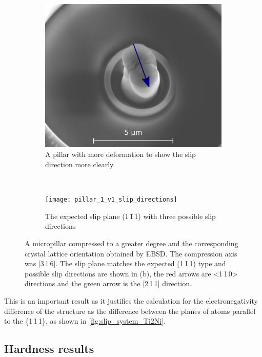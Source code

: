 \begin{figure}
\centering
\begin{subfigure}{0.4\textwidth}
    \centering
    \includegraphics[width=\textwidth]{pillar_1_v1}
    \caption{A pillar with more deformation to show the slip direction more clearly.}
\end{subfigure}
~
\begin{subfigure}{0.4\textwidth}
    \centering
    \texttt{[image: pillar\_1\_v1\_slip\_directions]}
    \caption{The expected slip plane  (1\,\={1}\,1) with three possible slip directions }
\end{subfigure}
\caption[A compressed micropillar of  showing the slip direction.]{A micropillar compressed to a greater degree and the corresponding crystal lattice orientation obtained by EBSD. The compression axis was [3\,1\,6]. The slip plane matches the expected (1\,\={1}\,1) type and possible slip directions are shown in (b), the red arrows are <1\,1\,0> directions and the green arrow is the [2\,1\,1] direction.\label{fig:slip_direction}}
\end{figure}

This is an important result as it justifies the calculation for the electronegativity difference of the structure as the difference between the planes of atoms parallel to the \{1\,1\,1\}, as shown in \autoref{fig:slip_system_Ti2Ni}.






\FloatBarrier
\subsection{Hardness results}
\FloatBarrier


